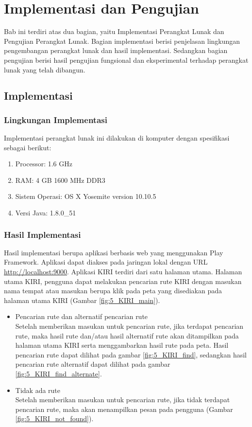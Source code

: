 \chapter{Implementasi dan Pengujian}
\label{chap:implementasiPengujian}

Bab ini terdiri atas dua bagian, yaitu Implementasi Perangkat Lunak dan Pengujian Perangkat Lunak. Bagian implementasi berisi penjelasan lingkungan pengembangan perangkat lunak dan hasil implementasi. Sedangkan bagian pengujian berisi hasil pengujian fungsional dan eksperimental terhadap perangkat lunak yang telah dibangun.

\section{Implementasi}
\label{sec:implementasi}

\subsection{Lingkungan Implementasi}
\label{sec:lingkungan_implementasi}
Implementasi perangkat lunak ini dilakukan di komputer dengan spesifikasi sebagai berikut:
\begin{enumerate}
	\item Processor: 1.6 GHz
	\item RAM: 4 GB 1600 MHz DDR3
	\item Sistem Operasi: OS X Yosemite version 10.10.5
	\item Versi Java: 1.8.0\_51
\end{enumerate}

\subsection{Hasil Implementasi}
Hasil implementasi berupa aplikasi berbasis web yang menggunakan Play Framework. Aplikasi dapat diakses pada jaringan lokal dengan URL \url{http://localhost:9000}. Aplikasi KIRI terdiri dari satu halaman utama. Halaman utama KIRI, pengguna dapat melakukan pencarian rute KIRI dengan masukan nama tempat atau masukan berupa klik pada peta yang disediakan pada halaman utama KIRI (Gambar \ref{fig:5_KIRI_main}).
\begin{itemize}
	\item Pencarian rute dan alternatif pencarian rute\\
	Setelah memberikan masukan untuk pencarian rute, jika terdapat pencarian rute, maka hasil rute dan/atau hasil alternatif rute akan ditampilkan pada halaman utama KIRI serta menggambarkan hasil rute pada peta. Hasil pencarian rute dapat dilihat pada gambar \ref{fig:5_KIRI_find}, sedangkan hasil pencarian rute alternatif dapat dilihat pada gambar \ref{fig:5_KIRI_find_alternate}.
	\item Tidak ada rute\\
	Setelah memberikan masukan untuk pencarian rute, jika tidak terdapat pencarian rute, maka akan menampilkan pesan pada pengguna (Gambar \ref{fig:5_KIRI_not_found}).
\end{itemize}

